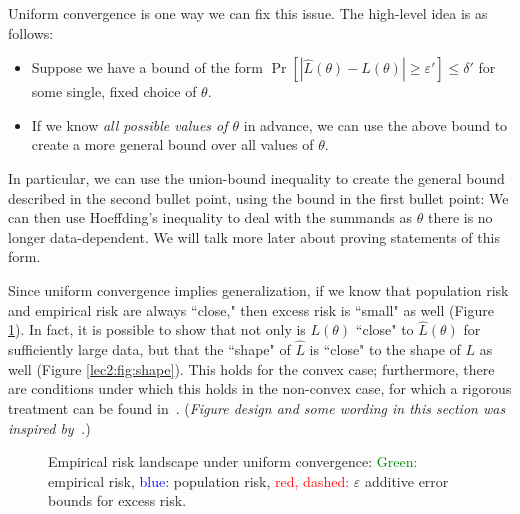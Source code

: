 
Uniform convergence is one way we can fix this issue. The high-level idea is as follows: 
\begin{itemize}
    \item Suppose we have a bound of the form $\Pr[|\hat{L}(\theta) - L(\theta)| \geq \varepsilon'] \leq \delta'$ for some single, fixed choice of $\theta$.
    \item If we know \emph{all possible values of $\theta$} in advance, we can use the above bound to create a more general bound over all values of $\theta$.
\end{itemize}
In particular, we can use the union-bound inequality to create the general bound described in the second bullet point, using the bound in the first bullet point:
We can then use Hoeffding's inequality to deal with the summands as $\theta$ there is no longer data-dependent. We will talk more later about proving statements of this form.


Since uniform convergence implies generalization, if we know that population risk and empirical risk are always ``close," then excess risk is ``small" as well (Figure \ref{lec2:fig:uc}). In fact, it is possible to show that not only is $L(\theta)$ ``close" to $\hat{L}(\theta)$ for sufficiently large data, but that the ``shape" of $\hat{L}$ is ``close" to the shape of $L$ as well (Figure \ref{lec2:fig:shape}). This holds for the convex case; furthermore, there are conditions under which this holds in the non-convex case, for which a rigorous treatment can be found in~\cite{mei2017landscape}. (\emph{Figure design and some wording in this section was inspired by~\cite{percynotes, thomasliu2018}.})

\begin{figure}[t]
    \centering
    \caption{Empirical risk landscape under uniform convergence: \textcolor{green}{Green:} empirical risk, \textcolor{blue}{blue:} population risk, \textcolor{red}{red, dashed:} $\varepsilon$ additive error bounds for excess risk.
    }
    \label{lec2:fig:uc}
\end{figure}

